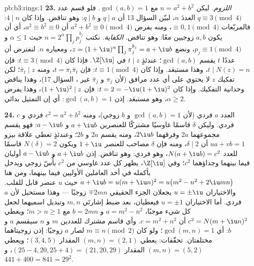 \begin{solution}{pb:b3:rings:1}
\textbf{23.} \emph{اللزوم.} ليكن $n = a^2 + b^2$ مع
$\gcd(a, b) = 1$. فلو قسم عدد  $q \equiv 3 \pmod 4$ العددَ $n$، لبيّن
السؤال 13 أن $q \mid a$ و $q \mid b$: وهو تناقض. وإذا كان
$4 \mid n$: فالمربّعات $\equiv 0, 1 \pmod 4$، ومنه يفرض $a^2 + b^2
\equiv 0 \pmod 4$ أن $a^2 \equiv b^2 \equiv 0$،
أي أن يكون $a,
b$ زوجيين معًا: وهو تناقض. \emph{الكفاية.}
نكتب $n =
2^{\alpha}\prod_jp_j^{b_j}$ حيث $\alpha \leq 1$ و $p_j
\equiv 1 \pmod 4$، ونضع $z = (1+\iu)^{\alpha}\prod_j
\pi_j^{b_j} = a + \iu b$،
ومعياره $n$. لنفترض أن عددًا  $t$ يقسم $\gcd(a, b)$؛ عندئذٍ
$t \mid z$ في $\Z[\iu]$. فإذا كان $t
\equiv 3 \pmod 4$: فإن $t \mid N(z) = n$، وهذا
مستبعَد. وإذا كان $t \equiv 1
\pmod 4$: فإن $t = \pi_t\bar\pi_t$، ومنه $\bar\pi_t \mid z$؛ لكن
تفكيك $z$ لا يحتوي على أي عدد  مرافق (لأن $\pi_j$ و
$\bar\pi_j$ غير ، السؤال 17)، وهذا يناقض وحدانية
التفكيك. وإذا كان $t = 2 = -\iu(1+\iu)^2$: فإن $(1+\iu)^2 \mid z$، وهذا يفرض
$\alpha \geq 2$، وهو مستبعَد. إذن $\gcd(a, b) = 1$: أي إن
التمثيل بدائي.

\textbf{24.} العدد $a$ فردي (لأن $\gcd(a, b) = 1$ و $b$ زوجي)،
ومنه $c^2
= a^2 + b^2$ فردي و $c$ فردي. وليكن $\delta$ قاسمًا غاوسيًا
 مشتركًا للعنصرين $a + \iu b$ و $a - \iu b$: فهو يقسم
مجموعهما $2a$ وفرقهما $2\iu b$، ومنه يقسم $2a$ و $2b$؛ وعندئذٍ
تعطي علاقة بيزو $ua + vb = 1$ أن $\delta \mid 2$، ومنه فإن
$\delta$ مصاحب للعنصر $1 + \iu$ ويكون $N(\delta) = 2$ قاسمًا
للعدد $N(a + \iu b) = c^2$، وهو فردي: وهو تناقض. إذن $a + \iu b$
و $a - \iu b$ أوليان فيما بينهما وجداؤهما $c^2$؛ وفي  $\Z[\iu]$، يظهر كل عدد غاوسي  من $c^2$ بأُسّ
زوجي ويدخل بأكمله في أحد العاملين الأوليين فيما بينهما، ومن هنا
$a + \iu b = u(m + \iu
n)^2 = u\bigl(m^2 - n^2 + 2\iu mn\bigr)$ حيث $u$ عنصر قابل للقلب. والاختياران $u = \pm\iu$
يجعلان الجزء الحقيقي $\mp 2mn$ زوجيًا --- وهذا مستحيل لأن $a$
فردي. أما الاختياران $u = \pm1$ فيعطيان، بعد ضبط إشارتَي $m, n$
وتبديل اسميهما لجعل كل شيء موجبًا، $a = m^2 - n^2$ و $b = 2mn$
مع $m > n
\geq 1$؛ ويعطي $c^2 = N(m + \iu n)^2$ أن $c = m^2 + n^2$. وأي قاسم مشترك
للعددين $m$ و $n$ سيقسم $a$ و $b$: أي $\gcd
(m, n) = 1$؛ ولو كان $m \equiv n \pmod 2$
لصار $a$ زوجيًا: إذن زوجيتاهما مختلفتان. تحقّقات: يعطي $(m, n) = (2, 1)$
المقدار $(3, 4,
5)$؛ ويعطي $(m, n) = (5, 2)$ المقدار $(25 - 4, 20, 25 + 4) = (21, 20,
29)$، و $441 + 400 = 841 = 29^2$.


\end{solution}
